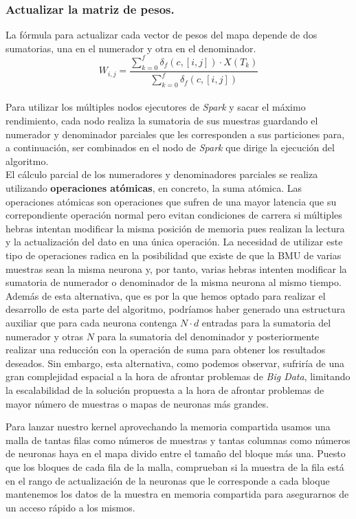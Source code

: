 \subsubsection{Actualizar la matriz de pesos.}
La fórmula para actualizar cada vector de pesos del mapa depende de dos sumatorias, una en el numerador y otra en el denominador.\\
$$
 W_{i, j} = \frac{\sum_{k=0}^{f} \delta_f(c, [i,j]) \cdot  X(T_k) }{\sum_{k=0}^{f} \delta_f(c, [i,j])}
$$\\

Para utilizar los múltiples nodos ejecutores de \textit{Spark} y sacar el máximo rendimiento, cada nodo realiza la sumatoria de sus muestras guardando el numerador y denominador parciales que les corresponden a sus particiones para, a continuación, ser combinados en el nodo de \textit{Spark} que dirige la ejecución del algoritmo.\\

El cálculo parcial de los numeradores y denominadores parciales se realiza utilizando \textbf{operaciones atómicas}, en concreto, la suma atómica. Las operaciones atómicas son operaciones que sufren de una mayor latencia que su correpondiente operación normal pero evitan condiciones de carrera si múltiples hebras intentan modificar la misma posición de memoria pues realizan la lectura y la actualización del dato en una única operación. La necesidad de utilizar este tipo de operaciones radica en la posibilidad que existe de que la BMU de varias muestras sean la misma neurona y, por tanto, varias hebras intenten modificar la sumatoria de numerador o denominador de la misma neurona al mismo tiempo. Además de esta alternativa, que es por la que hemos optado para realizar el desarrollo de esta parte del algoritmo, podríamos haber generado una estructura auxiliar que para cada neurona contenga $N \cdot d$ entradas para la sumatoria del numerador y otras $N$ para la sumatoria del denominador y posteriormente realizar una reducción con la operación de suma para obtener los resultados deseados. Sin embargo, esta alternativa, como podemos observar, sufriría de una gran complejidad espacial a la hora de afrontar problemas de \textit{Big Data}, limitando la escalabilidad de la solución propuesta a la hora de afrontar problemas de mayor número de muestras o mapas de neuronas más grandes.

Para lanzar nuestro kernel aprovechando la memoria compartida usamos una malla de tantas filas como números de muestras y tantas columnas como 
números de neuronas haya en el mapa divido entre el tamaño del bloque más una. Puesto que los bloques de cada fila de la malla, comprueban si la muestra de la fila está en el rango de actualización de la neuronas que le corresponde a cada bloque mantenemos los datos de la muestra en memoria compartida para asegurarnos de un acceso rápido a los mismos.

